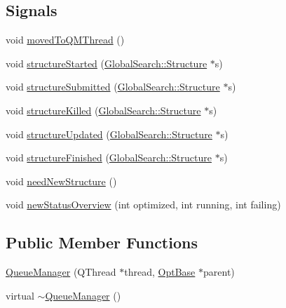 \subsection*{Signals}
\begin{DoxyCompactItemize}
\item 
void \hyperlink{classGlobalSearch_1_1QueueManager_a1453d56d967bc6ddaaca951c5a7d8c8f}{moved\+To\+Q\+M\+Thread} ()
\item 
void \hyperlink{classGlobalSearch_1_1QueueManager_a4309c24054c4752705f1d66d08358c9f}{structure\+Started} (\hyperlink{classGlobalSearch_1_1Structure}{Global\+Search\+::\+Structure} $\ast$s)
\item 
void \hyperlink{classGlobalSearch_1_1QueueManager_a97ce1e692cd752d62ebea8b2c56e1cd2}{structure\+Submitted} (\hyperlink{classGlobalSearch_1_1Structure}{Global\+Search\+::\+Structure} $\ast$s)
\item 
void \hyperlink{classGlobalSearch_1_1QueueManager_ad6e65416801d0cad4086fafb03990273}{structure\+Killed} (\hyperlink{classGlobalSearch_1_1Structure}{Global\+Search\+::\+Structure} $\ast$s)
\item 
void \hyperlink{classGlobalSearch_1_1QueueManager_aaf98cf54afb9751e185a5450c32f4595}{structure\+Updated} (\hyperlink{classGlobalSearch_1_1Structure}{Global\+Search\+::\+Structure} $\ast$s)
\item 
void \hyperlink{classGlobalSearch_1_1QueueManager_a9ce76b6d4be1aaa3e1f04724f9baa03a}{structure\+Finished} (\hyperlink{classGlobalSearch_1_1Structure}{Global\+Search\+::\+Structure} $\ast$s)
\item 
void \hyperlink{classGlobalSearch_1_1QueueManager_a4b50dbd51e53b1d0d5cb93e9d7380c1c}{need\+New\+Structure} ()
\item 
void \hyperlink{classGlobalSearch_1_1QueueManager_af37eb7a9e54e347a81dc3a1e373c8d54}{new\+Status\+Overview} (int optimized, int running, int failing)
\end{DoxyCompactItemize}
\subsection*{Public Member Functions}
\begin{DoxyCompactItemize}
\item 
\hyperlink{classGlobalSearch_1_1QueueManager_a41ab0186ccec173fe9400368ca2573be}{Queue\+Manager} (Q\+Thread $\ast$thread, \hyperlink{classGlobalSearch_1_1OptBase}{Opt\+Base} $\ast$parent)
\item 
virtual \hyperlink{classGlobalSearch_1_1QueueManager_a6eb307bcd037cd493d81dee2eeb87a52}{$\sim$\+Queue\+Manager} ()
\end{DoxyCompactItemize}
